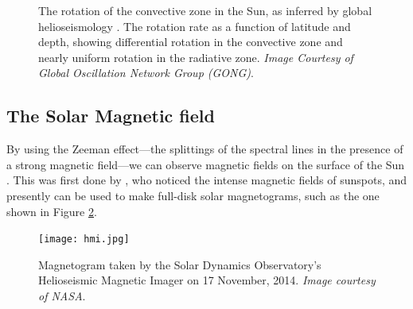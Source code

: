 \documentclass[11pt,a4paper,onecolumn]{report}
\begin{document}
\begin{figure}[t]%
  \centering
  \qquad
  \caption[]{ The rotation of the convective zone
    in the Sun, as inferred by global helioseismology
    \citep{thompson_helioseismology_2004}.  The
    rotation rate as a function of latitude and depth, showing differential
    rotation in the convective zone and nearly uniform rotation in the radiative
    zone. \textit{Image Courtesy of Global Oscillation Network Group
    (GONG)\footnotemark }.}
  \label{fig:solar_rotation}
\end{figure}



%
\subsection{The Solar Magnetic field}
%
\label{sec:dynamo}

By using the Zeeman effect---the splittings of the spectral lines in the presence of
a strong magnetic field---we can observe magnetic fields on the surface of
the Sun \citep{zeeman_over_1896}. This was first done by \citet{hale_probable_1908}, who noticed the
intense magnetic fields of sunspots, and presently can be used to make full-disk
solar magnetograms, such as the one shown in Figure \ref{fig:hmi}.
\\
\begin{figure}[t]
  \centering
  \texttt{[image: hmi.jpg]}
  \caption{Magnetogram taken by the Solar Dynamics Observatory's Helioseismic
  Magnetic Imager on 17 November, 2014. \textit{Image courtesy of NASA}.}
  \label{fig:hmi}
\end{figure}
\end{document}
